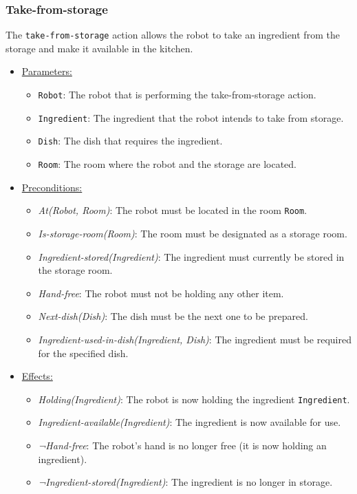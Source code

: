 \documentclass{article}
\begin{document}
\subsubsection{Take-from-storage}
The \texttt{take-from-storage} action allows the robot to take an ingredient from the storage and make it available in the kitchen.
\begin{itemize}
    \item \underline{Parameters:}
    \begin{itemize}
        \item \texttt{Robot}: The robot that is performing the take-from-storage action.
        \item \texttt{Ingredient}: The ingredient that the robot intends to take from storage.
        \item \texttt{Dish}: The dish that requires the ingredient.
        \item \texttt{Room}: The room where the robot and the storage are located.
    \end{itemize}
    \item \underline{Preconditions:}
    \begin{itemize}
        \item \textit{At(Robot, Room)}: The robot must be located in the room \texttt{Room}.
        \item \textit{Is-storage-room(Room)}: The room must be designated as a storage room.
        \item \textit{Ingredient-stored(Ingredient)}: The ingredient must currently be stored in the storage room.
        \item \textit{Hand-free}: The robot must not be holding any other item.
        \item \textit{Next-dish(Dish)}: The dish must be the next one to be prepared.
        \item \textit{Ingredient-used-in-dish(Ingredient, Dish)}: The ingredient must be required for the specified dish.
    \end{itemize}
    \item \underline{Effects:}
    \begin{itemize}
        \item \textit{Holding(Ingredient)}: The robot is now holding the ingredient \texttt{Ingredient}.
        \item \textit{Ingredient-available(Ingredient)}: The ingredient is now available for use.
        \item \textit{¬Hand-free}: The robot's hand is no longer free (it is now holding an ingredient).
        \item \textit{¬Ingredient-stored(Ingredient)}: The ingredient is no longer in storage.
    \end{itemize}
\end{itemize}
\end{document}
